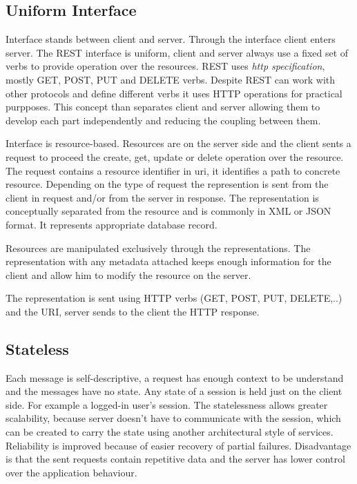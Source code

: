 
\subsection{Uniform Interface}
  
Interface stands between client and server. Through the interface client enters server. The REST interface is uniform, client and server always use a fixed set of verbs to provide operation over the resources. REST uses \emph{\gls{http} specification}, mostly GET, POST, PUT and DELETE verbs. Despite REST can work with other protocols and define different verbs it uses HTTP operations for practical purpposes. This concept than separates client and server allowing them to develop each part independently and reducing the coupling between them. %

Interface is resource-based. Resources are on the server side and the client sents a request to proceed the create, get, update or delete operation over the resource. The request contains a resource identifier in \gls{uri}, it identifies a path to concrete resource. Depending on the type of request the represention is sent from the client in request and/or from the server in response. The representation is conceptually separated from the resource and is commonly in XML or JSON format. It represents appropriate database record.

Resources are manipulated exclusively through the representations. The representation with any metadata attached keeps enough information for the client and allow him to modify the resource on the server.


The representation is sent using HTTP verbs (GET, POST, PUT, DELETE,..) and the URI, server sends to the client the HTTP response.

\subsection{Stateless}
  
Each message is self-descriptive, a request has enough context to be understand and the messages have no state. Any state of a \gls{session} is held just on the client side. For example a logged-in user's session.
The statelessness allows greater scalability, because server doesn't have to communicate with the session, which can be created to carry the state using another architectural style of services. Reliability is improved because of easier recovery of partial failures. Disadvantage is that the sent requests contain repetitive data and the server has lower control over the application behaviour.

